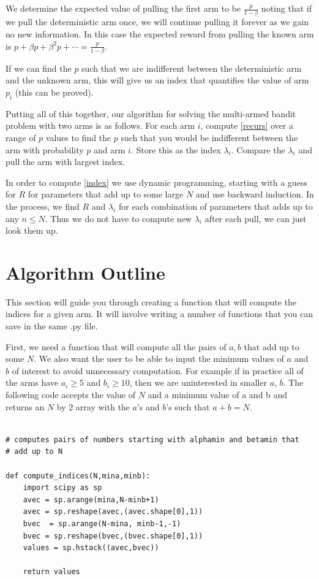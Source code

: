 We determine the expected value of pulling the first arm to be $\frac{p}{1-\beta}$ noting that if we pull the deterministic arm once, we will continue pulling it forever as we gain no new information.  In this case the expected reward from pulling the known arm is $p + \beta p + \beta^2 p + \cdots = \frac{p}{1-\beta}$.


If we can find the $p$ such that we are indifferent between the deterministic arm and the unknown arm, this will give us an index that quantifies the value of arm $p_i$ (this can be proved).

Putting all of this together, our algorithm for solving the multi-armed bandit problem with two arms is as follows.  For each arm $i$, compute \eqref{recurs} over a range of $p$ values to find the $p$ such that you would be indifferent between the arm with probability $p$ and arm $i$. Store this as the index $\lambda_i$.  Compare the $\lambda_i$ and pull the arm with largest index.

In order to compute \eqref{index} we use dynamic programming, starting with a guess for $R$ for parameters that add up to some large $N$ and use backward induction.  In the process, we find $R$ and $\lambda_i$ for each combination of parameters that adds up to any $n\leq N$. Thus we do not have to compute new $\lambda_i$ after each pull, we can just look them up.

\section*{Algorithm Outline}
This section will guide you through creating a function that will compute the indices for a given arm.  It will involve writing a number of functions that you can save in the same .py file.

First, we need a function that will compute all the pairs of $a,b$ that add up to some $N$.  We also want the user to be able to input the minimum values of $a$ and $b$ of interest to avoid unnecessary computation.  For example if in practice all of the arms have $a_i \geq 5$ and $b_i \geq 10$, then we are uninterested in smaller $a$, $b$.  The following code accepts the value of $N$ and a minimum value of a and b and returns an $N$ by 2 array with the $a$'s and $b$'s such that $a + b = N$.

\begin{lstlisting}[style = python]

# computes pairs of numbers starting with alphamin and betamin that
# add up to N

def compute_indices(N,mina,minb):
    import scipy as sp
    avec = sp.arange(mina,N-minb+1)
    avec = sp.reshape(avec,(avec.shape[0],1))
    bvec  = sp.arange(N-mina, minb-1,-1)
    bvec = sp.reshape(bvec,(bvec.shape[0],1))
    values = sp.hstack((avec,bvec))

    return values
\end{lstlisting}

